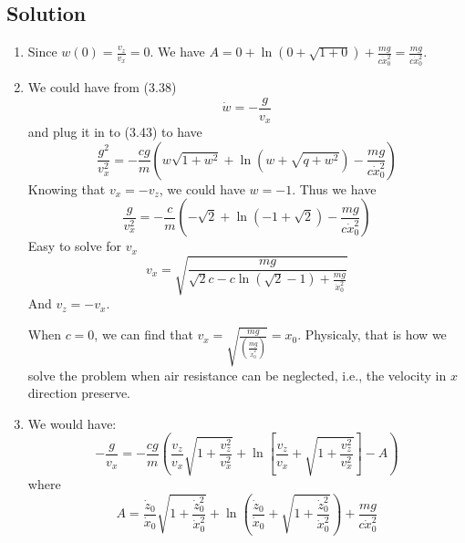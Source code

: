 \documentclass[aps,prl,reprint]{revtex4-1}
\begin{document}
\subsection{Solution}
\begin{enumerate}
    \item Since $w(0) = \frac{v_z}{v_x} = 0$. We have $A = 0 + \ln(0 + \sqrt{1+0})+\frac{mg}{c\dot{x}_0^2} = \frac{mg}{c\dot{x}_0^2}$.
    \item We could have from (3.38)
    \[
        \dot{w} = -\frac{g}{v_x}
    \]
    and plug it in to (3.43) to have
    \[
        \frac{g^2}{v_x^2} = -\frac{cg}{m}(w\sqrt{1+w^2}+\ln(w+\sqrt{q+w^2})-\frac{mg}{c\dot{x}_0^2})
    \]
    Knowing that $v_x = -v_z$, we could have $w = -1$. Thus we have
    \[
        \frac{g}{v_x^2} = -\frac{c}{m}(-\sqrt{2}+\ln(-1+\sqrt{2})-\frac{mg}{c\dot{x}_0^2})
    \]
    Easy to solve for $v_x$
    \[
        v_x = \sqrt{\frac{mg}{\sqrt{2}c-c\ln(\sqrt{2}-1)+\frac{mg}{\dot{x}_0^2}}}
    \]
    And $v_z = -v_x$.

    When $c = 0$, we can find that $v_x = \sqrt{\frac{mg}{(\frac{mg}{\dot{x}_0^2})}} = x_0$. Physicaly, that is how we solve the problem when air resistance can be neglected, i.e., the velocity in $x$ direction preserve.
    \item We would have:
    \[
    -\frac{g}{v_x} = -\frac{cg}{m}(\frac{v_z}{v_x}\sqrt{1+\frac{v_z^2}{v_x^2}}+\ln[\frac{v_z}{v_x} + \sqrt{1+\frac{v_z^2}{v_x^2}}]-A)
    \]
    where 
    \[
    A = \frac{\dot{z}_0}{\dot{x}_0}\sqrt{1 + \frac{\dot{z}_0^2}{\dot{x}_0^2}} + \ln(\frac{\dot{z}_0}{\dot{x}_0} + \sqrt{1+ \frac{\dot{z}_0^2}{\dot{x}_0^2}})+\frac{mg}{c\dot{x}^2_0}
    \]
\end{enumerate}


\end{document}

